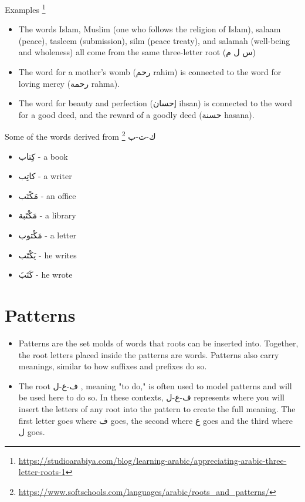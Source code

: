 Examples
\footnote{\url{https://studioarabiya.com/blog/learning-arabic/appreciating-arabic-three-letter-roots-1}}
\begin{itemize}	    \setlength{\itemsep}{5pt}
	\item The words \textarabic{Islam}, \textarabic{Muslim} (one who follows the religion of Islam), salaam (peace), \textarabic{tasleem} (submission), \textarabic{silm} (peace treaty), and \textarabic{salamah} (well-being and wholeness) all come from the same three-letter root (\textarabic{س ل م})
	
	\item The word for a mother’s womb (\textarabic{رحم} rahim) is connected to the word for loving mercy (\textarabic{رحمة} rahma).
	
	\item  The word for beauty and perfection (\textarabic{إحسان} ihsan) is connected to the word for a good deed, and the reward of a goodly deed (\textarabic{حسنة} hasana).
	
\end{itemize}

Some of the words derived from \textarabic{ك-ت-ب}
\footnote{\url{https://www.softschools.com/languages/arabic/roots_and_patterns/}}
\begin{itemize}	    \setlength{\itemsep}{5pt}
	\item \textarabic{كِتاب} - a book
	\item \textarabic{كاتِب} - a writer
	\item \textarabic{مَكْتَب} - an office
	\item \textarabic{مَكْتَبة} - a library
	\item \textarabic{مَكْتوب} - a letter
	\item \textarabic{يَكْتَب} - he writes
	\item \textarabic{كَتَبَ} - he wrote
\end{itemize}
\section{Patterns}

\begin{itemize}	    \setlength{\itemsep}{5pt}
	\item Patterns are the set molds of words that roots can be inserted into. Together, the root letters placed inside the patterns are words. Patterns also carry meanings, similar to how suffixes and prefixes do so.
	\item The root \textarabic{ف-ع-ل} , meaning "to do," is often used to model patterns and will be used here to do so. In these contexts, \textarabic{ف-ع-ل} represents where you will insert the letters of any root into the pattern to create the full meaning. The first letter goes where \textarabic{ف} goes, the second where \textarabic{ع} goes and the third where \textarabic{ل} goes.
	
\end{itemize}




